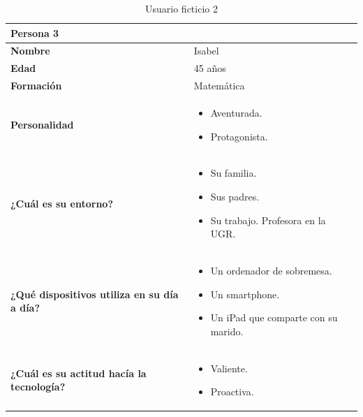 \begin{table}[H]
   \begin{center}
      \begin{tabular}{| p{} |
                   p{} |}
         \hline
         Persona 3 &  \\ \hline
         \textbf{Nombre} & Isabel \\
         \textbf{Edad} & 45 años \\
         \textbf{Formación} & Matemática \\
         \textbf{Personalidad} & \begin{itemize}
                \item Aventurada.
                \item Protagonista.
            \end{itemize} \\
         \textbf{¿Cuál es su entorno?} & \begin{itemize}
                \item Su familia.
                \item Sus padres.
                \item Su trabajo. Profesora en la UGR.
            \end{itemize} \\
         \textbf{¿Qué dispositivos utiliza en su día a día?} & \begin{itemize}
                \item Un ordenador de sobremesa.
                \item Un smartphone.
                \item Un iPad que comparte con su marido.
            \end{itemize} \\
            \textbf{¿Cuál es su actitud hacía la tecnología?} & \begin{itemize}
                \item Valiente.
                \item Proactiva.
            \end{itemize} \\
            \hline
      \end{tabular}
      \caption{Usuario ficticio 2}
   \end{center}
\end{table}

